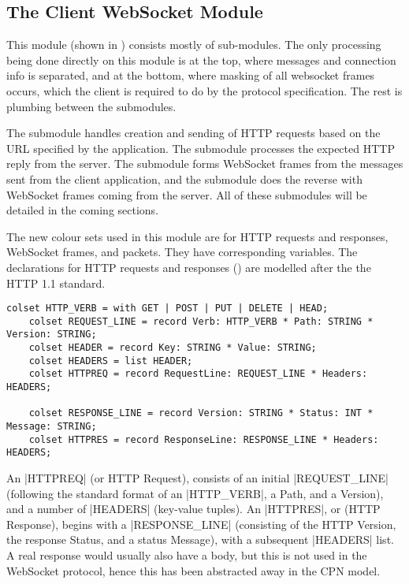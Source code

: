 \subsection{The Client WebSocket Module}\label{sec:client_ws}


	This module (shown in ) consists mostly of sub-modules.
	The only processing being done directly on this module is at the top, where
	messages and connection info is separated, and at the bottom, where
	masking of all websocket frames occurs, which the client is required to do by
	the protocol specification. The rest is plumbing between the submodules. 
	
	The  submodule handles creation and sending of
	HTTP requests based on the URL specified by the application. The 
	 submodule processes the expected HTTP reply from
	the server. The  submodule forms WebSocket frames from
	the messages sent from the client application, and the  submodule does the reverse with WebSocket frames coming from the
	server. All of these submodules will be detailed in the coming sections.
	
	The new colour sets used in this module are for HTTP requests and responses,
	WebSocket frames, and packets. They have corresponding variables. The
	declarations for HTTP requests and responses ()
	are modelled after the  the HTTP 1.1 standard.
	
	\begin{lstlisting}[label=lst:client_lib_colset_http,caption=HTTP colour
	sets,gobble=1,float=h]
	colset HTTP_VERB = with GET | POST | PUT | DELETE | HEAD;
	colset REQUEST_LINE = record Verb: HTTP_VERB * Path: STRING * Version: STRING;
	colset HEADER = record Key: STRING * Value: STRING;
	colset HEADERS = list HEADER;
	colset HTTPREQ = record RequestLine: REQUEST_LINE *	Headers: HEADERS;
	
	colset RESPONSE_LINE = record Version: STRING * Status: INT * Message: STRING;
	colset HTTPRES = record ResponseLine: RESPONSE_LINE * Headers: HEADERS;
	\end{lstlisting}
	 
	An |HTTPREQ| (or HTTP Request),	consists of an initial |REQUEST_LINE|
	(following the standard format of an |HTTP_VERB|, a Path, and a Version), and
	a number of |HEADERS| (key-value tuples). An |HTTPRES|, or (HTTP Response),
	begins with a |RESPONSE_LINE| (consisting of the HTTP Version, the response
	Status, and a status Message), with a subsequent |HEADERS| list. A real
	response would usually also have a body, but this is not used in the
	WebSocket protocol, hence this has been abstracted away in the CPN model.
	
